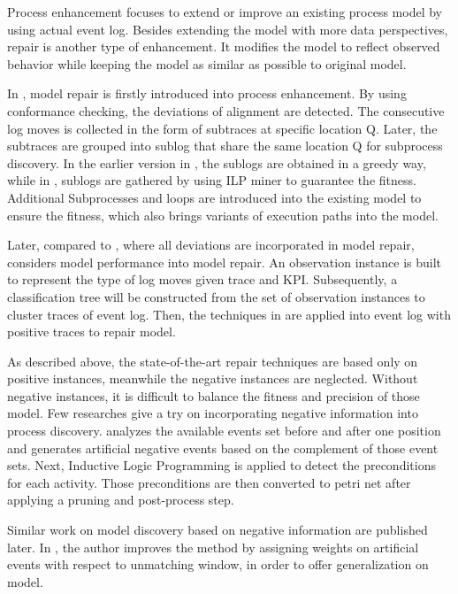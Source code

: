 Process enhancement focuses to extend or improve an existing process model by using actual event log\cite{van2011process}. Besides extending the model with more data perspectives, repair is another type of enhancement. It modifies the model to reflect observed behavior while keeping the model as similar as possible to original model.

In \cite{fahland2012repairing}, model repair is firstly introduced into process enhancement. By using conformance checking, the deviations of alignment are detected. The consecutive log moves is collected in the form of subtraces at specific location Q. Later, the subtraces are grouped into sublog that share the same location Q for subprocess discovery. In the earlier version in \cite{fahland2012repairing}, the sublogs are obtained in a greedy way, while in \cite{fahland2015model}, sublogs are gathered by using ILP miner to guarantee the fitness. Additional Subprocesses and loops are introduced into the existing model to ensure the fitness, which also brings variants of execution paths into the model. 

Later, compared to \cite{fahland2012repairing, fahland2015model}, where all deviations are incorporated in model repair, \cite{dees2017enhancing} considers model performance into model repair. An observation instance is built to represent the type of log moves given trace and  KPI. Subsequently, a classification tree will be constructed from the set of observation instances to cluster traces of event log. Then, the techniques in \cite{fahland2015model} are applied into event log with positive traces to repair model. 


As described above, the state-of-the-art repair techniques are based only on positive instances, meanwhile the negative instances are neglected. Without negative instances, it is difficult to balance the fitness and precision of those model. Few researches give a try on incorporating negative information into process discovery. \cite{goedertier2009robust}  analyzes the available events set before and after one position and generates artificial negative events based on the complement of those event sets. Next, Inductive Logic Programming is applied to detect the preconditions for each activity. Those preconditions are then converted to petri net after applying a pruning and post-process step. 

Similar work on model discovery based on negative information are published later. In \cite{vanden2014determining}, the author improves the method by assigning weights on artificial events with respect to unmatching window, in order to offer generalization on model. 

